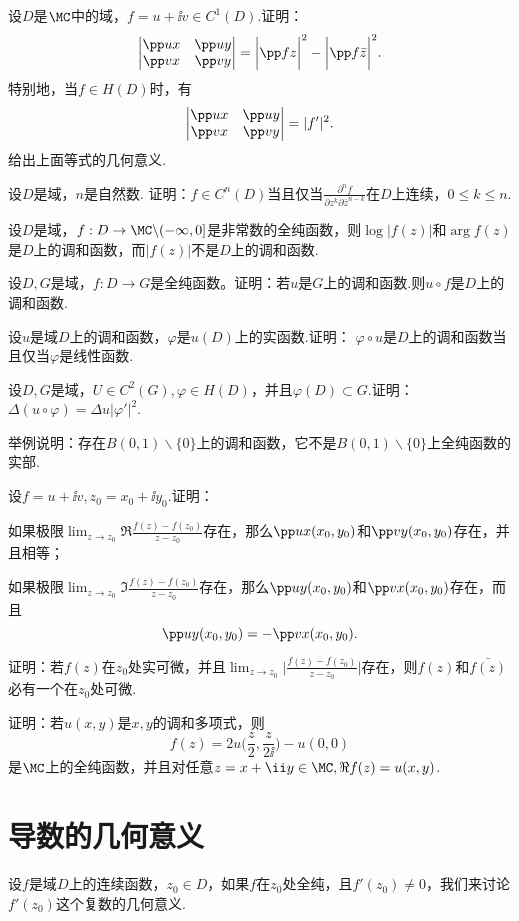 \begin{xiti}
\item 设$D$是$\MC$中的域，$f=u+\ii v\in C^1(D)$.证明：
\[\begin{vmatrix}
\pp ux&\pp uy\\\pp vx&\pp vy
\end{vmatrix}=\bigg|\pp fz\bigg|^2-\bigg|\pp f{\bar z}\bigg|^2.\]
特别地，当$f\in H(D)$时，有
\[\begin{vmatrix}
\pp ux&\pp uy\\\pp vx&\pp vy
\end{vmatrix}=|f'|^2.\]
给出上面等式的几何意义.
\item 设$D$是域，$n$是自然数. 证明：$f\in C^n(D)$当且仅当$\frac{\partial^nf}{\partial z^k\partial\bar z^{n-k}}$在$D$上连续，$0\le k\le n$.
\item 设$D$是域，$f:D\to\MC\backslash(-\infty,0]$是非常数的全纯函数，则$\log |f(z)|$和$\arg f(z)$是$D$上的调和函数，而$|f(z)|$不是$D$上的调和函数.
\item 设$D,G$是域，$f:D\to G$是全纯函数。证明：若$u$是$G$上的调和函数.则$u\circ f$是$D$上的调和函数.
\item 设$u$是域$D$上的调和函数，$\varphi$是$u(D)$上的实函数.证明：
$\varphi\circ u$是$D$上的调和函数当且仅当$\varphi$是线性函数.
\item 设$D,G$是域，$U\in C^2(G),\varphi\in H(D)$，并且$\varphi(D)\subset G$.证明：$\Delta (u\circ \varphi)=\Delta u|\varphi'|^2$.
\item 举例说明：存在$B(0,1)\backslash\{0\}$上的调和函数，它不是$B(0,1)\backslash\{0\}$上全纯函数的实部.
\item 设$f=u+\ii v,z_0=x_0+\ii y_0$.证明：
\begin{enuma}
  \item 如果极限$\lim_{z\to z_0}\Re\frac{f(z)-f(z_0)}{z-z_0}$存在，那么$\pp ux(x_0,y_0)$和$\pp vy(x_0,y_0)$存在，并且相等；
  \item 如果极限$\lim_{z\to z_0}\Im\frac{f(z)-f(z_0)}{z-z_0}$存在，那么$\pp uy(x_0,y_0)$和$\pp vx(x_0,y_0)$存在，而且
      \[\pp uy(x_0,y_0)=-\pp vx(x_0,y_0).\]
\end{enuma}
\item 证明：若$f(z)$在$z_0$处实可微，并且$\lim_{z\to z_0}\bigg|\frac{f(z)-f(z_0)}{z-z_0}\bigg|$存在，则$f(z)$和$\bar{f(z)}$必有一个在$z_0$处可微.
\item 证明：若$u(x,y)$是$x,y$的调和多项式，则
\[f(z)=2u\bigg(\frac z2,\frac z{2\ii}\bigg)-u(0,0)\]
是$\MC$上的全纯函数，并且对任意$z=x+\ii y\in\MC,\Re f(z)=u(x,y)$.
\end{xiti}

\section{导数的几何意义\label{sec2.3}}
设$f$是域$D$上的连续函数，$z_0\in D$，如果$f$在$z_0$处全纯，且$f'(z_0)\ne0$，我们来讨论$f'(z_0)$这个复数的几何意义.

